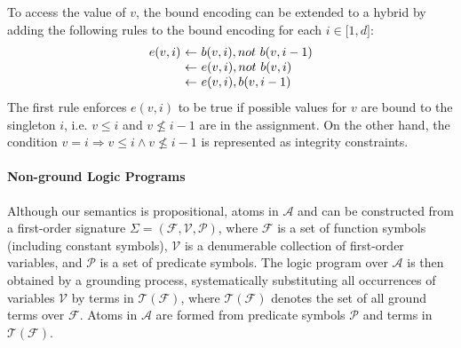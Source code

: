 \documentclass[letterpaper]{article}
\newcommand{\alphabet}{\mathcal{A}}
\newcommand{\dneg}{not\ }
\begin{document}
To access the value of $v$, the bound encoding can be extended to a hybrid by adding the following rules to the bound encoding for each $i \in \lbrack 1, d \rbrack$:
\[
\begin{array}{r@{\ \leftarrow\ }l}
e(v, i) & b(v, i), \dneg b(v, i-1) \\
& e(v, i), \dneg b(v, i)\\
& e(v, i), b(v, i-1)
\end{array}
\]
The first rule enforces $e(v, i)$ to be true if possible values for $v$ are bound to the singleton $i$, i.e. $v \leq i$ and $v \not\leq i-1$ are in the assignment. On the other hand, the condition $v = i \Rightarrow v \leq i \land v \not\leq i-1$ is represented as integrity constraints.

\paragraph{Non-ground Logic Programs}
Although our semantics is propositional, atoms in $\alphabet$ and can be constructed from a first-order signature $\Sigma = (\mathcal{F}, \mathcal{V}, \mathcal{P})$, where
$\mathcal{F}$ is a set of function symbols (including constant symbols),
$\mathcal{V}$ is a denumerable collection of first-order variables, and
$\mathcal{P}$ is a set of predicate symbols.
The logic program over $\alphabet$ is then obtained by a grounding process, systematically substituting all occurrences of variables $\mathcal{V}$ by terms in $\mathcal{T}(\mathcal{F})$, where $\mathcal{T}(\mathcal{F})$ denotes the set of all ground terms over $\mathcal{F}$. Atoms in $\alphabet$ are formed from predicate symbols $\mathcal{P}$ and terms in $\mathcal{T}(\mathcal{F})$.
\end{document}
